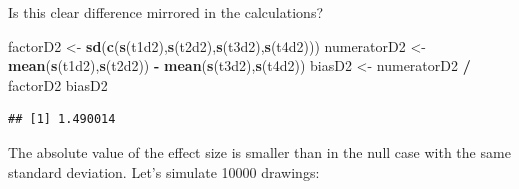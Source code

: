 \documentclass[10pt,dvipsnames,enabledeprecatedfontcommands]{scrartcl}
\newenvironment{Shaded}{\begin{snugshade}}{\end{snugshade}}
\newcommand{\KeywordTok}[1]{\textcolor[rgb]{0.13,0.29,0.53}{\textbf{#1}}}
\newcommand{\StringTok}[1]{\textcolor[rgb]{0.31,0.60,0.02}{#1}}
\newcommand{\OperatorTok}[1]{\textcolor[rgb]{0.81,0.36,0.00}{\textbf{#1}}}
\newcommand{\NormalTok}[1]{#1}
\begin{document}
\normalsize

\noindent  Is this clear difference mirrored in the calculations?

\footnotesize

\begin{Shaded}
\begin{Highlighting}[]
\NormalTok{factorD2 <-}\StringTok{ }\KeywordTok{sd}\NormalTok{(}\KeywordTok{c}\NormalTok{(}\KeywordTok{s}\NormalTok{(t1d2),}\KeywordTok{s}\NormalTok{(t2d2),}\KeywordTok{s}\NormalTok{(t3d2),}\KeywordTok{s}\NormalTok{(t4d2)))}
\NormalTok{numeratorD2 <-}\StringTok{  }\KeywordTok{mean}\NormalTok{(}\KeywordTok{s}\NormalTok{(t1d2),}\KeywordTok{s}\NormalTok{(t2d2)) }\OperatorTok{-}\StringTok{ }\KeywordTok{mean}\NormalTok{(}\KeywordTok{s}\NormalTok{(t3d2),}\KeywordTok{s}\NormalTok{(t4d2))}
\NormalTok{biasD2 <-}\StringTok{ }\NormalTok{numeratorD2 }\OperatorTok{/}\StringTok{ }\NormalTok{factorD2}
\NormalTok{biasD2}
\end{Highlighting}
\end{Shaded}

\begin{verbatim}
## [1] 1.490014
\end{verbatim}

\normalsize 

\noindent The absolute value of the effect size is smaller than in the
null case with the same standard deviation. Let's simulate 10000
drawings:

\vspace{1mm} \footnotesize
\end{document}
